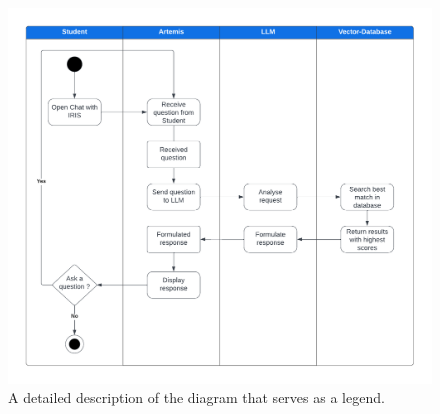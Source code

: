 \documentclass[a4paper,12pt,twoside]{article}
\begin{document}
\begin{figure}[ht]
\centering
\includegraphics[width=1.1\textwidth]{Proposal Activity Diagram.pdf}
\captionsetup{font=small, labelfont=bf, justification=centering, format=plain}
\caption[Short version for List of Figures]{A detailed description of the diagram that serves as a legend.}
\label{fig:diagram}
\end{figure}
\end{document}
